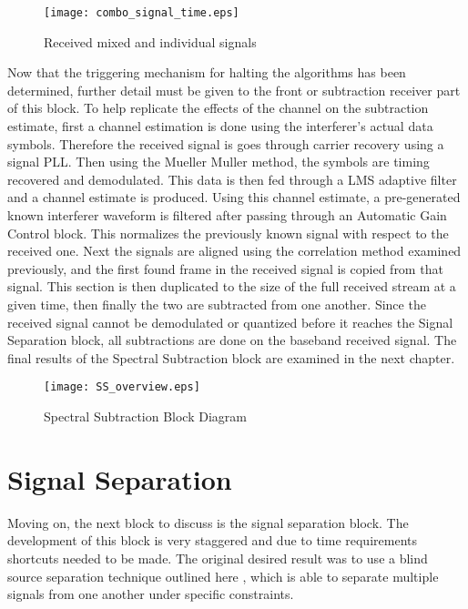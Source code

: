 \begin{figure}[!ht]\label{combo_signal_time}
\centering
\texttt{[image: combo\_signal\_time.eps]}
\caption{Received mixed and individual signals}
\end{figure}


Now that the triggering mechanism for halting the algorithms has been determined, further detail must be given to the front or subtraction receiver part of this block.  To help replicate the effects of the channel on the subtraction estimate, first a channel estimation is done using the interferer's actual data symbols.  Therefore the received signal is goes through carrier recovery using a signal PLL.  Then using the Mueller Muller method, the symbols are timing recovered and demodulated.  This data is then fed through a LMS adaptive filter and a channel estimate is produced.  Using this channel estimate, a pre-generated known interferer waveform is filtered after passing through an Automatic Gain Control block. This normalizes the previously known signal with respect to the received one.  Next the signals are aligned using the correlation method examined previously, and the first found frame in the received signal is copied from that signal.  This section is then duplicated to the size of the full received stream at a given time, then finally the two are subtracted from one another.  Since the received signal cannot be demodulated or quantized before it reaches the Signal Separation block, all subtractions are done on the baseband received signal.  The final results of the Spectral Subtraction block are examined in the next chapter.\\

\begin{figure}[!ht]\label{ss_overview}
\centering
\texttt{[image: SS\_overview.eps]}
\caption{Spectral Subtraction Block Diagram}
\end{figure}


\section{Signal Separation}

Moving on, the next block to discuss is the signal separation block.  The development of this block is very staggered and due to time requirements shortcuts needed to be made.  The original desired result was to use a blind source separation technique outlined here \cite{AMUSE}, which is able to separate multiple signals from one another under specific constraints.  %

